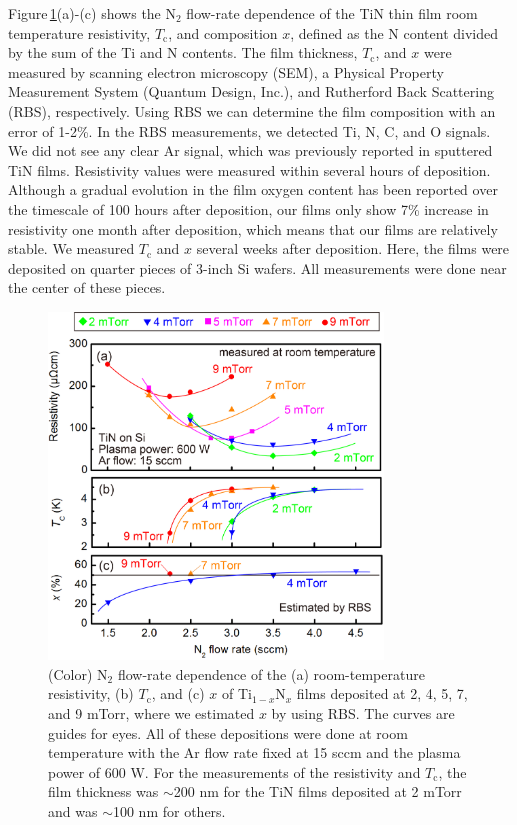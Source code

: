 Figure\,\ref{BasicProperties}(a)-(c) shows the N$_{2}$ flow-rate dependence of the TiN thin film room temperature resistivity, $T_{\text{c}}$, and composition $x$, defined as the N content divided by the sum of the Ti and N contents. The film thickness,  $T_{\text{c}}$, and $x$ were measured by scanning electron microscopy (SEM), a Physical Property Measurement System (Quantum Design, Inc.), and Rutherford Back Scattering (RBS), respectively. Using RBS we can determine the film composition with an error of 1-2\%. In the RBS measurements, we detected Ti, N, C, and O signals. We did not see any clear Ar signal, which was previously reported in sputtered TiN films.\cite{Williams1987}  Resistivity values were measured within several hours of deposition.  Although a gradual evolution in the film oxygen content has been reported over the timescale of 100 hours after deposition\cite{Logothetidis1999}, our films only show 7\% increase in resistivity one month after deposition, which means that our films are relatively stable.  We measured $T_{\text{c}}$ and $x$ several weeks after deposition. Here, the films were deposited on quarter pieces of 3-inch Si wafers.  All measurements were done near the center of these pieces.

\begin{figure}
\begin{center}
\includegraphics[width=89mm]{BasicProperties.jpg}
\end{center}
\caption{(Color) N$_{2}$ flow-rate dependence of the (a) room-temperature resistivity, (b) $T_{\text{c}}$, and (c) $x$ of Ti$_{1-x}$N$_{x}$ films deposited at 2, 4, 5, 7, and 9 mTorr, where we estimated $x$ by using RBS. The curves are guides for eyes. All of these depositions were done at room temperature with the Ar flow rate fixed at 15 sccm and the plasma power of 600 W. For the measurements of the resistivity and $T_{\text{c}}$, the film thickness was $\sim$200 nm for the TiN films deposited at 2 mTorr and was $\sim$100 nm for others.}
\label{BasicProperties}
\end{figure}


